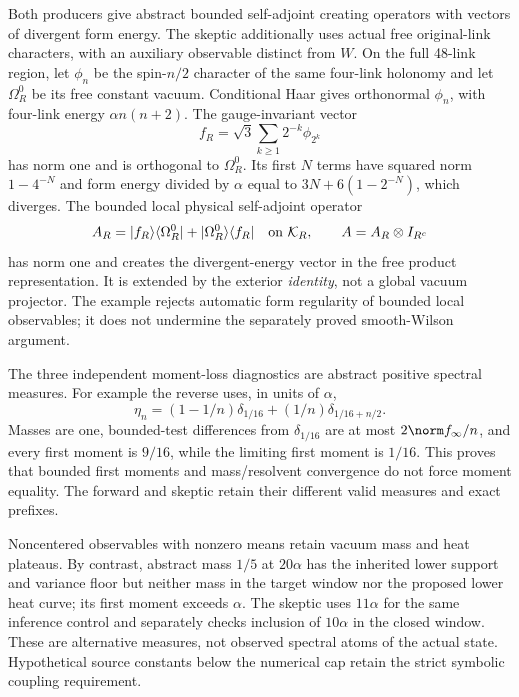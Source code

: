 Both producers give abstract bounded self-adjoint creating operators with vectors of divergent form energy. The skeptic additionally uses actual free original-link characters, with an auxiliary observable distinct from $W$. On the full 48-link region, let $\phi_n$ be the spin-$n/2$ character of the same four-link holonomy and let $\Omega_R^0$ be its free constant vacuum. Conditional Haar gives orthonormal $\phi_n$, with four-link energy $\alpha n(n+2)$. The gauge-invariant vector
\begin{equation}
 f_R=\sqrt3\sum_{k\ge1}2^{-k}\phi_{2^k}
\end{equation}
has norm one and is orthogonal to $\Omega_R^0$. Its first $N$ terms have squared norm $1-4^{-N}$ and form energy divided by $\alpha$ equal to $3N+6(1-2^{-N})$, which diverges. The bounded local physical self-adjoint operator
\begin{equation}
 A_R=|f_R\rangle\langle\Omega_R^0|
       +|\Omega_R^0\rangle\langle f_R|
 \quad\hbox{on }\mathcal K_R,
 \qquad A=A_R\otimes I_{R^c}
 \label{r28:eq:ak2-local-counter}
\end{equation}
has norm one and creates the divergent-energy vector in the free product representation. It is extended by the exterior \emph{identity}, not a global vacuum projector. The example rejects automatic form regularity of bounded local observables; it does not undermine the separately proved smooth-Wilson argument.

The three independent moment-loss diagnostics are abstract positive spectral measures. For example the reverse uses, in units of $\alpha$,
\begin{equation}
 \eta_n=(1-1/n)\delta_{1/16}+(1/n)\delta_{1/16+n/2}.
\end{equation}
Masses are one, bounded-test differences from $\delta_{1/16}$ are at most $2\norm f_\infty/n$, and every first moment is $9/16$, while the limiting first moment is $1/16$. This proves that bounded first moments and mass/resolvent convergence do not force moment equality. The forward and skeptic retain their different valid measures and exact prefixes.

Noncentered observables with nonzero means retain vacuum mass and heat plateaus. By contrast, abstract mass $1/5$ at $20\alpha$ has the inherited lower support and variance floor but neither mass in the target window nor the proposed lower heat curve; its first moment exceeds $\alpha$. The skeptic uses $11\alpha$ for the same inference control and separately checks inclusion of $10\alpha$ in the closed window. These are alternative measures, not observed spectral atoms of the actual state. Hypothetical source constants below the numerical cap retain the strict symbolic coupling requirement.

